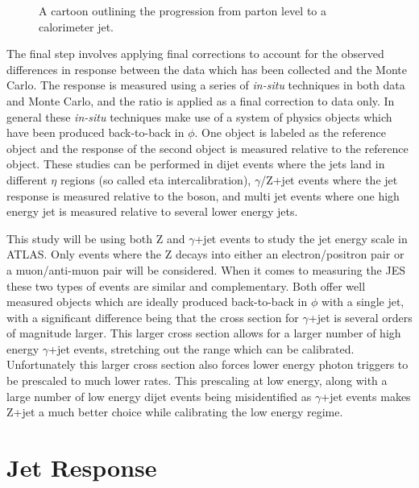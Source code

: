 \begin{figure}[!ht]
  \begin{center}
  \end{center}
  \caption[Jet showering evolution.]
      {\small A cartoon outlining the progression from parton level to a calorimeter jet.}
  \label{JetCalibSequenceFig}
\end{figure}


The final step involves applying final corrections to account for the observed differences in response between the data which has been collected and the Monte Carlo.  
The response is measured using a series of \textit{in-situ} techniques in both data and Monte Carlo, and the ratio is applied as a final correction to data only.  
In general these \textit{in-situ} techniques make use of a system of physics objects which have been produced back-to-back in $\phi$.  
One object is labeled as the reference object and the response of the second object is measured relative to the reference object.  
These studies can be performed in dijet events where the jets land in different $\eta$ regions (so called eta intercalibration), $\gamma$/Z+jet events where the jet response is measured relative to the boson, and multi jet events where one high energy jet is measured relative to several lower energy jets.  

This study will be using both Z and $\gamma$+jet events to study the jet energy scale in ATLAS.  
Only events where the Z decays into either an electron/positron pair or a muon/anti-muon pair will be considered.  
When it comes to measuring the JES these two types of events are similar and complementary.  
Both offer well measured objects which are ideally produced back-to-back in $\phi$ with a single jet, with a significant difference being that the cross section for $\gamma$+jet is several orders of magnitude larger.   
This larger cross section allows for a larger number of high energy $\gamma$+jet events, stretching out the range which can be calibrated.  
Unfortunately this larger cross section also forces lower energy photon triggers to be prescaled to much lower rates.  
This prescaling at low energy, along with a large number of low energy dijet events being misidentified as $\gamma$+jet events makes Z+jet a much better choice while calibrating the low energy regime.  

\section{Jet Response}

